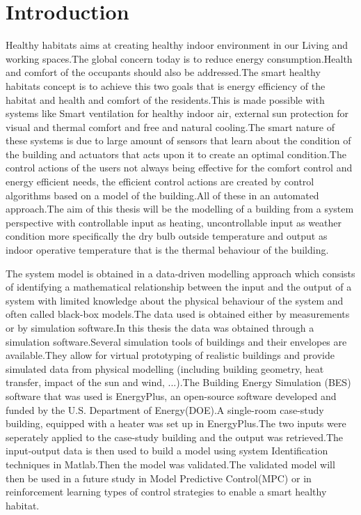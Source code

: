 \documentclass[a4paper,12pt]{report}
\numberwithin{equation}{section}
\begin{document}
\newpage

\tableofcontents
\newpage
\newpage

\setlength{\parindent}{1em}
\chapter{Introduction}
Healthy habitats aims at creating healthy indoor environment in our Living and working spaces.The global concern today is to reduce energy consumption.Health and comfort of the occupants should also be addressed.The smart healthy habitats concept is to achieve this two goals that is energy efficiency of the habitat and health and comfort of the residents.This is made possible with systems like Smart ventilation for healthy indoor air, external sun protection for visual and thermal comfort and free and natural cooling.The smart nature of these systems is due to large amount of sensors that learn about the condition of the building and actuators that acts upon it to create an optimal condition.The control actions of the users  not always being effective for the comfort control and energy efficient needs, the efficient control actions are created by control algorithms based on a model of the building.All of these in an automated approach.The aim of this thesis will be the modelling of a building from a system perspective with controllable input as heating, uncontrollable input as weather condition more specifically the dry bulb outside temperature and output as indoor operative temperature that is the thermal behaviour of the building.  

The system model is obtained in a data-driven modelling approach which consists of identifying a mathematical relationship between the input and the output of a system with limited knowledge about the physical behaviour of the system and often called black-box models.The data used is obtained either by measurements or by simulation software.In this thesis the data was obtained through a simulation software.Several simulation tools of buildings and their envelopes are available.They allow for virtual prototyping of realistic buildings and provide simulated data from physical modelling (including building geometry, heat transfer, impact of the sun and wind, ...).The Building Energy Simulation (BES) software that was used is EnergyPlus, an open-source software developed and funded by the U.S. Department of Energy(DOE).A  single-room case-study building, equipped with a heater was set up in EnergyPlus.The two inputs were seperately applied to the case-study building and the output was retrieved.The input-output data is then used to build a model using system Identification techniques in Matlab.Then the model was validated.The validated model will then be used in a future study in Model Predictive Control(MPC) or in reinforcement learning types of control strategies to enable a smart healthy habitat.
\end{document}
